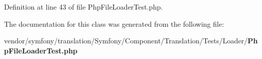 Definition at line 43 of file Php\+File\+Loader\+Test.\+php.



The documentation for this class was generated from the following file\+:\begin{DoxyCompactItemize}
\item 
vendor/symfony/translation/\+Symfony/\+Component/\+Translation/\+Tests/\+Loader/{\bf Php\+File\+Loader\+Test.\+php}\end{DoxyCompactItemize}
